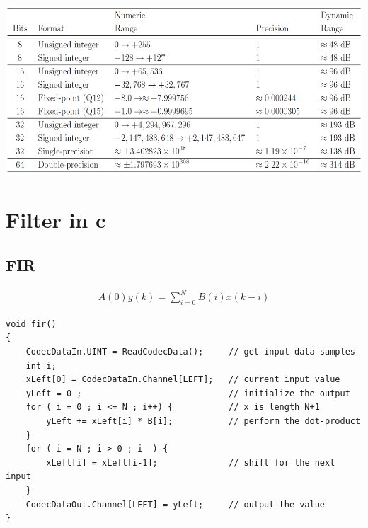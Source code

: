 \documentclass[10pt,a4paper]{article}
\begin{document}
  \begin{center}
      \includegraphics[width=.35\textwidth]{./img/dynamic.png}
  \end{center}

\section{Filter in c}
\subsection{FIR}
  \begin{mdframed}[style=exercise]
    \begin{align}
        A(0)y(k)=\sum_{i=0}^{N} B(i) x(k-i) 
    \end{align}
  \end{mdframed}
\begin{verbatim}
void fir()
{
    CodecDataIn.UINT = ReadCodecData();     // get input data samples
    int i;
    xLeft[0] = CodecDataIn.Channel[LEFT];   // current input value
    yLeft = 0 ;                             // initialize the output
    for ( i = 0 ; i <= N ; i++) {           // x is length N+1
        yLeft += xLeft[i] * B[i];           // perform the dot-product
    }
    for ( i = N ; i > 0 ; i--) {
        xLeft[i] = xLeft[i-1];              // shift for the next input
    }
    CodecDataOut.Channel[LEFT] = yLeft;     // output the value
}
\end{verbatim}
\end{document}
